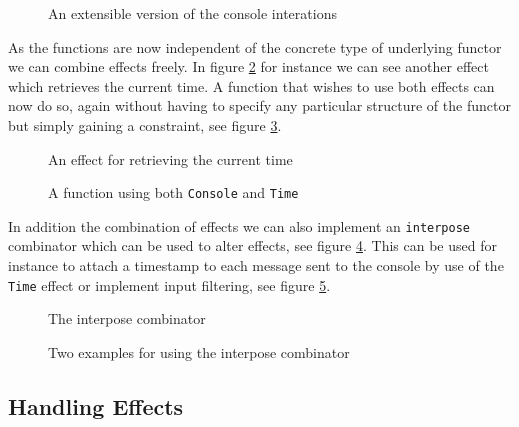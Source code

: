 \begin{figure}
  
  \caption{An extensible version of the console interations}
  \label{fig:extensible-console-effect}
\end{figure}

As the functions are now independent of the concrete type of underlying functor
we can combine effects freely. In figure \ref{fig:time-effect} for instance we
can see another effect which retrieves the current time. A function that wishes
to use both effects can now do so, again without having to specify any
particular structure of the functor but simply gaining a constraint, see figure
\ref{fig:combined-console-time-effect}.

\begin{figure}
  
  \caption{An effect for retrieving the current time}
  \label{fig:time-effect}
\end{figure}

\begin{figure}
  
  \caption{A function using both \texttt{Console} and \texttt{Time}}
  \label{fig:combined-console-time-effect}
\end{figure}

In addition the combination of effects we can also implement an
\texttt{interpose} combinator which can be used to alter effects, see
figure \ref{fig:interpose-combinator}. This can be used for instance to attach a
timestamp to each message sent to the console by use of the \texttt{Time} effect
or implement input filtering, see figure \ref{fig:attach-timestamp}.

\begin{figure}
  
  \caption{The interpose combinator}
  \label{fig:interpose-combinator}
\end{figure}

\begin{figure}
  
  \caption{Two examples for using the interpose combinator}
  \label{fig:attach-timestamp}
\end{figure}

\subsection{Handling Effects}

